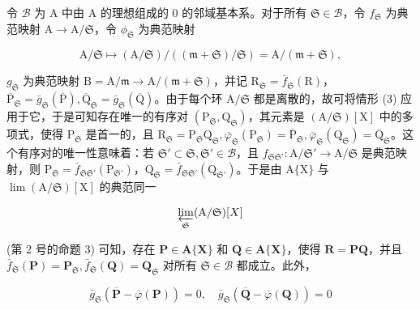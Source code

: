 令 \(\mathcal{B}\) 为 A 中由 A 的理想组成的 0 的邻域基本系。对于所有 \(\mathfrak{S} \in \mathcal{B}\)，令 \(f_{\mathfrak{S}}\) 为典范映射 \(\mathrm{A} \to \mathrm{A} / \mathfrak{S}\)，令 \(\phi_{\mathfrak{S}}\) 为典范映射

\[
\mathrm{A} / \mathfrak{S} \mapsto (\mathrm{A} / \mathfrak{S}) / ((\mathfrak {m} + \mathfrak{S}) / \mathfrak{S}) = \mathrm{A} / (\mathfrak {m} + \mathfrak{S}),
\]

\(g_{\mathfrak{S}}\) 为典范映射 \(\mathrm{B} = \mathrm{A} / \mathfrak{m}\to \mathrm{A} /(\mathfrak{m} + \mathfrak{S})\)，并记 \(\mathrm{R}_{\mathfrak{S}} = \bar{f}_{\mathfrak{S}}(\mathrm{R})\)，\(\overline{\mathrm{P}}_{\mathfrak{S}} = \bar{g}_{\mathfrak{S}}(\overline{\mathrm{P}}),\overline{\mathrm{Q}}_{\mathfrak{S}} = \bar{g}_{\mathfrak{S}}(\overline{\mathrm{Q}})\)。由于每个环 \(\mathrm{A} / \mathfrak{S}\) 都是离散的，故可将情形 (3) 应用于它，于是可知存在唯一的有序对 \((\mathrm{P}_{\mathfrak{S}},\mathrm{Q}_{\mathfrak{S}})\)，其元素是 \((\mathrm{A} / \mathfrak{S})[\mathrm{X}]\) 中的多项式，使得 \(\mathrm{P}_{\mathfrak{S}}\) 是首一的，且 \(\mathrm{R}_{\mathfrak{S}} = \mathrm{P}_{\mathfrak{S}}\mathrm{Q}_{\mathfrak{S}},\overline{\varphi}_{\mathfrak{S}}(\mathrm{P}_{\mathfrak{S}}) = \overline{\mathrm{P}}_{\mathfrak{S}},\overline{\varphi}_{\mathfrak{S}}(\mathrm{Q}_{\mathfrak{S}}) = \overline{\mathrm{Q}}_{\mathfrak{S}}\)。这个有序对的唯一性意味着：若 \(\mathfrak{S}'\subset \mathfrak{S},\mathfrak{S}'\in \mathcal{B}\)，且 \(f_{\mathfrak{S}\mathfrak{S}'}:\mathrm{A} / \mathfrak{S}'\rightarrow \mathrm{A} / \mathfrak{S}\) 是典范映射，则 \(\mathrm{P}_{\mathfrak{S}} = \bar{f}_{\mathfrak{S}\mathfrak{S}'}(\mathrm{P}_{\mathfrak{S}'})\)，\(\mathrm{Q}_{\mathfrak{S}} = \bar{f}_{\mathfrak{S}\mathfrak{S}'}(\mathrm{Q}_{\mathfrak{S}'})\)。于是由 \(\mathrm{A}\{\mathrm{X}\}\) 与 \(\lim (\mathrm{A} /\mathfrak{S})[\mathrm{X}]\) 的典范同一

\[
\varprojlim_ {\mathfrak {S}} (\mathrm{A} / \mathfrak {S}) [ X ]
\]

(第 2 号的命题 3) 可知，存在 \(\mathbf{P} \in \mathbf{A}\{\mathbf{X}\}\) 和 \(\mathbf{Q} \in \mathbf{A}\{\mathbf{X}\}\)，使得 \(\mathbf{R} = \mathbf{PQ}\)，并且 \(\bar{f}_{\mathfrak{S}}(\mathbf{P}) = \mathbf{P}_{\mathfrak{S}}, \bar{f}_{\mathfrak{S}}(\mathbf{Q}) = \mathbf{Q}_{\mathfrak{S}}\) 对所有 \(\mathfrak{S} \in \mathcal{B}\) 都成立。此外，

\[
\bar {g} _ {\mathfrak {S}} (\overline {{{\mathbf {P}}}} - \overline {{{\varphi}}} (\mathbf {P})) = 0, \quad \bar {g} _ {\mathfrak {S}} (\overline {{{\mathbf {Q}}}} - \overline {{{\varphi}}} (\mathbf {Q})) = 0
\]

